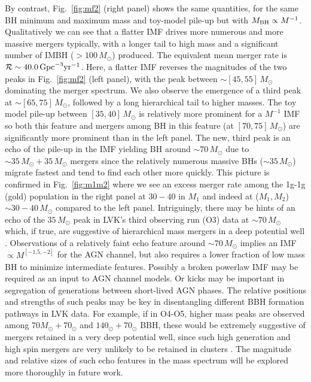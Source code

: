 By contrast, Fig.~\ref{fig:mf2} (right panel) shows the same quantities, for the same BH minimum and maximum mass and toy-model pile-up but with $M_{\rm BH} \propto M^{-1}$. Qualitatively we can see that a flatter IMF drives more numerous and more massive mergers typically, with a longer tail to high mass and a significant number of IMBH ($>100\,M_{\odot}$) produced. The equivalent mean merger rate is $\mathcal{R}\sim 40.0\,{\rm Gpc}^{-3}{\rm yr}^{-1}$. Here, a flatter IMF reverses the magnitudes of the two peaks in Fig.~\ref{fig:mf2} (left panel), with the peak between $\sim [45,55]\,M_{\odot}$ dominating the merger spectrum. We also observe the emergence of a third peak at $\sim [65,75]\,M_{\odot}$, followed by a long hierarchical tail to higher masses. The toy model pile-up between $[35,40]\,M_{\odot}$ is relatively more prominent for a $M^{-1}$ IMF so both this feature and mergers among BH in this feature (at $[70,75]\,M_{\odot}$) are significantly more prominent than in the left panel. The new, third peak is an echo of the pile-up in the IMF yielding BH around $\sim 70\,M_{\odot}$ due to $\sim 35\,M_{\odot}+35\,M_{\odot}$ mergers since the relatively numerous massive BHs ($\sim 35\,M_{\odot}$) migrate fastest and tend to find each other more quickly. This picture is confirmed in Fig.~\ref{fig:m1m2} where we see an excess merger rate among the 1g-1g (gold) population in the right panel at $30-40$ in $M_{1}$ and indeed at ($M_{1},M_{2}$)$\sim 30-40\,M_{\odot}$ compared to the left panel. Intriguingly, there may be hints of an echo of the $35\,M_{\odot}$ peak in LVK's third observing run (O3) data at $\sim 70\,M_{\odot}$ which, if true, are suggestive of hierarchical mass mergers in a deep potential well \citep{Ignacio24}.  Observations of a relatively faint echo feature around $\sim 70\,M_{\odot}$ implies an IMF $\propto M^{[-1.5,-2]}$ for the AGN channel, but also requires a lower fraction of low mass BH to minimize intermediate features. Possibly a broken powerlaw IMF may be required as an input to AGN channel models. Or kicks may be important in segregation of generations between short-lived AGN phases. The relative positions and strengths of such peaks may be key in disentangling different BBH formation pathways in LVK data. For example, if in O4-O5, higher mass peaks are observed among $70M_{\odot}+70_{\odot}$ and $140_{\odot}+70_{\odot}$ BBH, these would be extremely suggestive of mergers retained in a very deep potential well, since such high generation and high spin mergers are very unlikely to be retained in clusters \citep[see also][]{FordMcKernan25}. The magnitude and relative sizes of such echo features in the mass spectrum will be explored more thoroughly in future work. 

